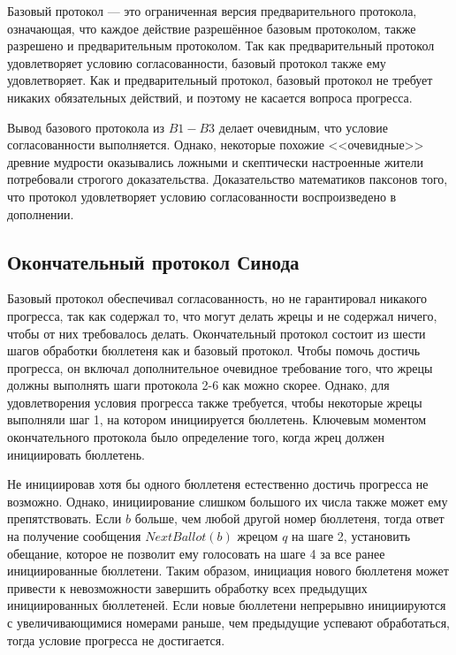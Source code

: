 \documentclass[12pt, a4paper]{article} %
\begin{document}
Базовый протокол --- это ограниченная версия предварительного протокола, означающая, что каждое действие разрешённое базовым протоколом, также разрешено и предварительным протоколом. Так как предварительный протокол удовлетворяет условию согласованности, базовый протокол также ему удовлетворяет. Как и предварительный протокол, базовый протокол не требует никаких обязательных действий, и поэтому не касается вопроса прогресса.

Вывод базового протокола из $B1 - B3$ делает очевидным, что условие согласованности выполняется. Однако, некоторые похожие <<очевидные>> древние мудрости оказывались ложными и скептически настроенные жители потребовали строгого доказательства. Доказательство математиков паксонов того, что протокол удовлетворяет условию согласованности воспроизведено в дополнении.

\subsection{Окончательный протокол Синода}

Базовый протокол обеспечивал согласованность, но не гарантировал никакого прогресса, так как содержал то, что могут делать жрецы и не содержал ничего, чтобы от них требовалось делать. Окончательный протокол состоит из шести шагов обработки бюллетеня как и базовый протокол. Чтобы помочь достичь прогресса, он включал дополнительное очевидное требование того, что жрецы должны выполнять шаги протокола 2-6 как можно скорее. Однако, для удовлетворения условия прогресса также требуется, чтобы некоторые жрецы выполняли шаг 1, на котором инициируется бюллетень. Ключевым  моментом окончательного протокола было определение того, когда жрец должен инициировать бюллетень.

Не инициировав хотя бы одного бюллетеня естественно достичь прогресса не возможно. Однако, инициирование слишком большого их числа также может ему препятствовать. Если $b$ больше, чем любой другой номер бюллетеня, тогда ответ на получение сообщения $NextBallot(b)$  жрецом $q$ на шаге 2, установить обещание, которое не позволит ему голосовать на шаге 4 за все ранее инициированные бюллетени. Таким образом, инициация нового бюллетеня может привести к невозможности завершить обработку всех предыдущих инициированных бюллетеней. Если новые бюллетени непрерывно инициируются с увеличивающимися номерами раньше, чем предыдущие успевают обработаться, тогда условие прогресса не достигается.
\end{document}
